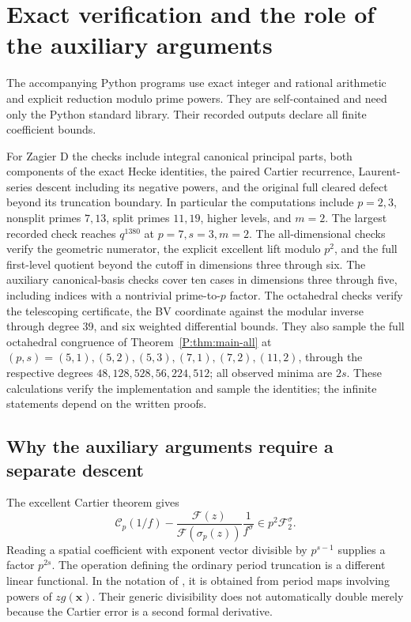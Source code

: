 \documentclass[11pt,a4paper]{article}
\theoremstyle{definition}\newtheorem{definition}[theorem]{Definition}
\theoremstyle{remark}\newtheorem{remark}[theorem]{Remark}
\numberwithin{equation}{section}
\begin{document}
\section{Exact verification and the role of the auxiliary arguments}\label{T:source-main-6}
\label{T:sec:verification-remaining}

The accompanying Python programs use exact integer and rational
arithmetic and explicit reduction modulo prime powers.  They are
self-contained and need only the Python standard library.  Their
recorded outputs declare all finite coefficient bounds.

For Zagier D the checks include integral canonical principal parts,
both components of the exact Hecke identities, the paired Cartier
recurrence, Laurent-series descent including its negative powers, and
the original full cleared defect beyond its truncation boundary.
In particular the computations include $p=2,3$, nonsplit primes
$7,13$, split primes $11,19$, higher levels, and $m=2$.
The largest recorded check reaches $q^{1380}$ at $p=7,s=3,m=2$.
The all-dimensional checks verify the geometric numerator,
the explicit excellent lift modulo $p^2$, and the full first-level
quotient beyond the cutoff in dimensions three through six.
The auxiliary canonical-basis checks cover ten cases in dimensions
three through five, including indices with a nontrivial prime-to-$p$
factor.  The octahedral checks verify the telescoping certificate,
the BV coordinate against the modular inverse through degree 39,
and six weighted differential bounds.  They also sample the
full octahedral congruence of Theorem~\ref{P:thm:main-all} at $(p,s)=(5,1),(5,2),(5,3),
(7,1),(7,2),(11,2)$, through the respective degrees
$48,128,528,56,224,512$; all observed minima are $2s$.
These calculations verify the implementation and sample the identities;
the infinite statements depend on the written proofs.

\subsection{Why the auxiliary arguments require a separate descent}

The excellent Cartier theorem gives
\[
 \mathscr C_p(1/f)-\frac{\mathcal F(z)}{\mathcal F(\sigma_p(z))}
                         \frac1{f^\sigma}
 \in p^2\mathscr F_2^\sigma.
\]
Reading a spatial coefficient with exponent vector divisible by
$p^{s-1}$ supplies a factor $p^{2s}$.  The operation defining the
ordinary period truncation is a different linear functional.  In
the notation of \cite[Section 4.3]{Vl24}, it is obtained from
period maps involving powers of $zg(\mathbf{x})$.  Their generic
divisibility does not automatically double merely because the
Cartier error is a second formal derivative.
\end{document}
